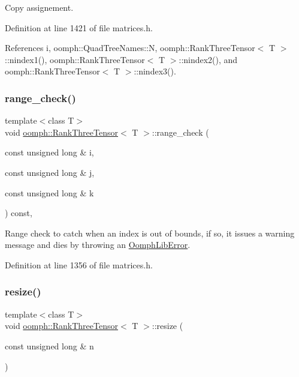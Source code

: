 Copy assignement. 



Definition at line 1421 of file matrices.\+h.



References i, oomph\+::\+Quad\+Tree\+Names\+::N, oomph\+::\+Rank\+Three\+Tensor$<$ T $>$\+::nindex1(), oomph\+::\+Rank\+Three\+Tensor$<$ T $>$\+::nindex2(), and oomph\+::\+Rank\+Three\+Tensor$<$ T $>$\+::nindex3().

\mbox{\label{classoomph_1_1RankThreeTensor_a7a54cd8aaf72f4876314ed23aa9b813e}} 
\subsubsection{\texorpdfstring{range\+\_\+check()}{range\_check()}}
{\footnotesize\ttfamily template$<$class T$>$ \\
void \hyperlink{classoomph_1_1RankThreeTensor}{oomph\+::\+Rank\+Three\+Tensor}$<$ T $>$\+::range\+\_\+check (\begin{DoxyParamCaption}\item[{const unsigned long \&}]{i,  }\item[{const unsigned long \&}]{j,  }\item[{const unsigned long \&}]{k }\end{DoxyParamCaption}) const\hspace{0.3cm}{\ttfamily [inline]}, {\ttfamily [private]}}



Range check to catch when an index is out of bounds, if so, it issues a warning message and dies by throwing an {\ttfamily \hyperlink{classoomph_1_1OomphLibError}{Oomph\+Lib\+Error}}. 



Definition at line 1356 of file matrices.\+h.

\mbox{\label{classoomph_1_1RankThreeTensor_ab09490399cf8db93b08e07f893e8724d}} 
\subsubsection{\texorpdfstring{resize()}{resize()}\hspace{0.1cm}{\footnotesize\ttfamily [1/3]}}
{\footnotesize\ttfamily template$<$class T$>$ \\
void \hyperlink{classoomph_1_1RankThreeTensor}{oomph\+::\+Rank\+Three\+Tensor}$<$ T $>$\+::resize (\begin{DoxyParamCaption}\item[{const unsigned long \&}]{n }\end{DoxyParamCaption})\hspace{0.3cm}{\ttfamily [inline]}}



